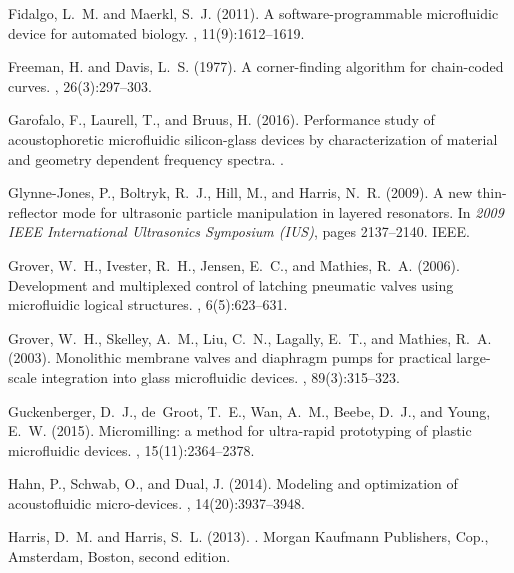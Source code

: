 \documentclass[12pt,letterpaper]{report}          %
\begin{document}
\begin{thebibliography}{}
Fidalgo, L.~M. and Maerkl, S.~J. (2011).
\newblock A software-programmable microfluidic device for automated biology.
, 11(9):1612--1619.

Freeman, H. and Davis, L.~S. (1977).
\newblock A corner-finding algorithm for chain-coded curves.
, 26(3):297--303.

Garofalo, F., Laurell, T., and Bruus, H. (2016).
\newblock Performance study of acoustophoretic microfluidic silicon-glass
  devices by characterization of material and geometry dependent frequency
  spectra.
.

Glynne-Jones, P., Boltryk, R.~J., Hill, M., and Harris, N.~R. (2009).
\newblock A new thin-reflector mode for ultrasonic particle manipulation in
  layered resonators.
\newblock In {\em 2009 IEEE International Ultrasonics Symposium (IUS)}, pages
  2137--2140. IEEE.

Grover, W.~H., Ivester, R.~H., Jensen, E.~C., and Mathies, R.~A. (2006).
\newblock Development and multiplexed control of latching pneumatic valves
  using microfluidic logical structures.
, 6(5):623--631.

Grover, W.~H., Skelley, A.~M., Liu, C.~N., Lagally, E.~T., and Mathies, R.~A.
  (2003).
\newblock Monolithic membrane valves and diaphragm pumps for practical
  large-scale integration into glass microfluidic devices.
, 89(3):315--323.

Guckenberger, D.~J., de~Groot, T.~E., Wan, A.~M., Beebe, D.~J., and Young,
  E.~W. (2015).
\newblock Micromilling: a method for ultra-rapid prototyping of plastic
  microfluidic devices.
, 15(11):2364--2378.

Hahn, P., Schwab, O., and Dual, J. (2014).
\newblock Modeling and optimization of acoustofluidic micro-devices.
, 14(20):3937--3948.

Harris, D.~M. and Harris, S.~L. (2013).
.
\newblock Morgan Kaufmann Publishers, Cop., Amsterdam, Boston, second edition.


\end{thebibliography}
\end{document}
